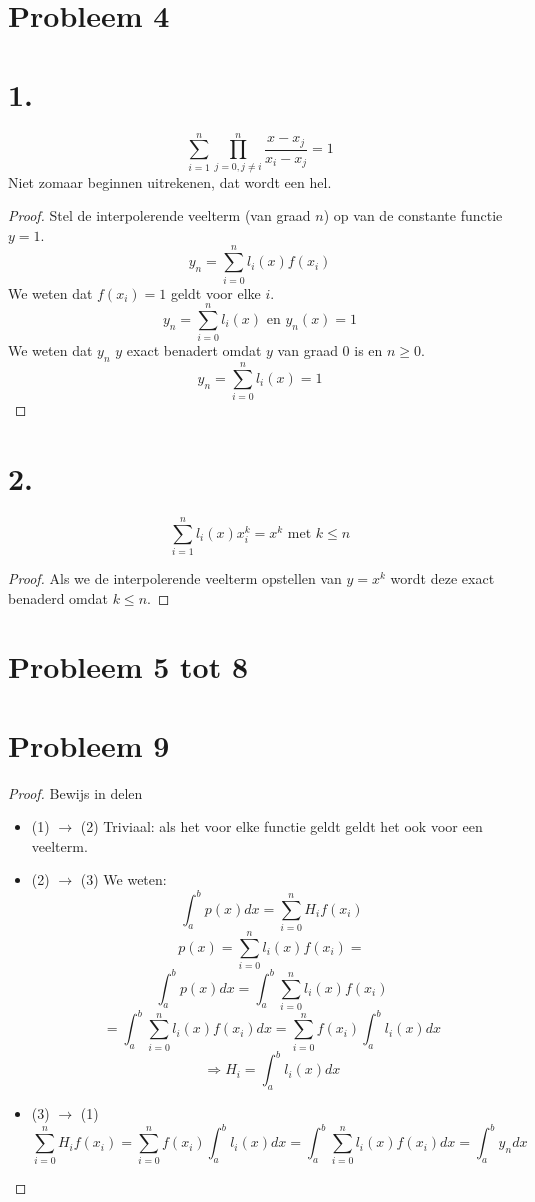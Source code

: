 \documentclass[12pt,a4paper]{article}
\begin{document}
\section{Probleem 4}
\section*{1.}
\[
\sum_{i=1}^{n}\prod_{j=0,j\neq i}^{n}\frac{x-x_j}{x_i-x_j}=1
\]
Niet zomaar beginnen uitrekenen, dat wordt een hel.
\begin{proof}
Stel de interpolerende veelterm (van graad $n$) op van de constante functie $y = 1$.
\[
y_n = \sum_{i=0}^{n}l_{i}(x)f(x_i)
\]
We weten dat $f(x_i) = 1$ geldt voor elke $i$.
\[
y_n = \sum_{i=0}^{n}l_{i}(x) \text{ en } y_n(x) = 1
\]
We weten dat $y_n$ $y$ exact benadert omdat $y$ van graad $0$ is en $n\ge 0$. 
\[
y_n = \sum_{i=0}^{n}l_{i}(x) = 1
\]
\end{proof}

\section*{2.}
\[
\sum_{i=1}^{n}l_i(x)x_{i}^{k}=x^{k} \text{ met } k \le n
\]
\begin{proof}
Als we de interpolerende veelterm opstellen van $y=x^k$ wordt deze exact benaderd omdat $k\le n$.
\end{proof}

\section{Probleem 5 tot 8}

\section{Probleem 9}
\begin{proof} Bewijs in delen
\begin{itemize}
\item (1) $\rightarrow$ (2) Triviaal: als het voor elke functie geldt geldt het ook voor een veelterm.
\item (2) $\rightarrow$ (3)
We weten:
\[
\int_{a}^{b}p(x)dx = \sum_{i=0}^{n}H_if(x_i)
\]
\[
p(x) = \sum_{i=0}^{n}l_i(x)f(x_i) =
\]
\[
\int_{a}^{b}p(x)dx = \int_{a}^{b}\sum_{i=0}^{n}l_i(x)f(x_i)
\]
\[
= \int_{a}^{b}\sum_{i=0}^{n}l_i(x)f(x_i)dx
= \sum_{i=0}^{n}f(x_i)\int_{a}^{b}l_i(x)dx
\]
\[
\Rightarrow H_i = \int_{a}^{b}l_i(x)dx
\]
\item (3) $\rightarrow$ (1)
\[
\sum_{i=0}^{n}H_if(x_i)
= \sum_{i=0}^{n}f(x_i)\int_{a}^{b}l_i(x)dx
= \int_{a}^{b}\sum_{i=0}^{n}l_i(x)f(x_i)dx
= \int_{a}^{b}y_ndx
\]
\end{itemize}
\end{proof}
\end{document}
